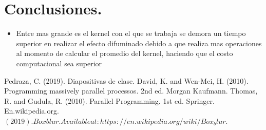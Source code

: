 \documentclass{IEEEtran}
\begin{document}
\begin{itemize}

\end{itemize}


\section*{Conclusiones.}
\begin{itemize}
  \item Entre mas grande es el kernel con el que se trabaja se demora un tiempo superior en realizar el efecto difuminado debido a que realiza mas operaciones al momento de calcular el promedio del kernel, haciendo que el costo computacional sea superior
\end{itemize}


\noindent 


\begin{thebibliography}{00}
 Pedraza, C. (2019). Diapositivas de clase.
David, K. and Wen-Mei, H. (2010). Programming massively parallel processos. 2nd ed. Morgan Kaufmann.
 Thomas, R. and Gudula, R. (2010). Parallel Programming. 1st ed. Springer.
 En.wikipedia.org. $(2019). Box blur.  Available at: https://en.wikipedia.org/wiki/Box_blur.$
\end{thebibliography}




\end{document}
